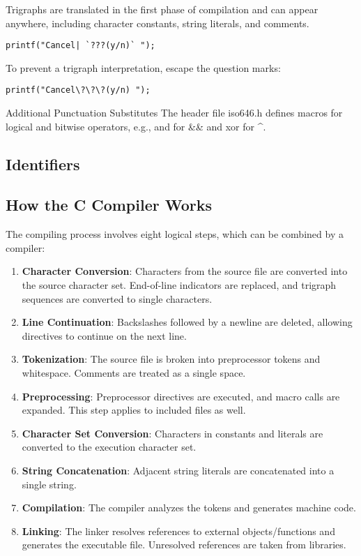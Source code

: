 Trigraphs are translated in the first phase of compilation and can appear anywhere, including character constants, string literals, and comments.
\begin{tcolorbox}[title=Example with trigraphs]
\begin{verbatim}
printf("Cancel| `???(y/n)` ");
\end{verbatim}
\end{tcolorbox}
To prevent a trigraph interpretation, escape the question marks:
\begin{tcolorbox}
\begin{verbatim}
printf("Cancel\?\?\?(y/n) ");
\end{verbatim}
\end{tcolorbox}
Additional Punctuation Substitutes
The header file iso646.h defines macros for logical and bitwise operators, e.g., and for \&\& and xor for \textasciicircum.

\subsection{Identifiers}



\subsection{How the C Compiler Works}
The compiling process involves eight logical steps, which can be combined by a compiler:
\begin{enumerate}
    \item \textbf{Character Conversion}: Characters from the source file are converted into the source character set. End-of-line indicators are replaced, and trigraph sequences are converted to single characters.
    \item \textbf{Line Continuation}: Backslashes followed by a newline are deleted, allowing directives to continue on the next line.
    \item \textbf{Tokenization}: The source file is broken into preprocessor tokens and whitespace. Comments are treated as a single space.
    \item \textbf{Preprocessing}: Preprocessor directives are executed, and macro calls are expanded. This step applies to included files as well.
    \item \textbf{Character Set Conversion}: Characters in constants and literals are converted to the execution character set.
    \item \textbf{String Concatenation}: Adjacent string literals are concatenated into a single string.
    \item \textbf{Compilation}: The compiler analyzes the tokens and generates machine code.
    \item \textbf{Linking}: The linker resolves references to external objects/functions and generates the executable file. Unresolved references are taken from libraries.
\end{enumerate}



